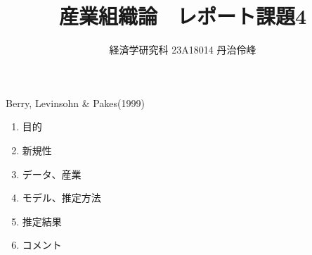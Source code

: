 \documentclass{jsarticle}
\begin{document}
\title{産業組織論　レポート課題4}
\author{経済学研究科 23A18014 丹治伶峰}
\date{}
\maketitle

Berry, Levinsohn \& Pakes(1999)

\begin{enumerate}

\item 目的

\item 新規性

\item データ、産業

\item モデル、推定方法

\item 推定結果
 
\item コメント

\end{enumerate}
\end{document}
